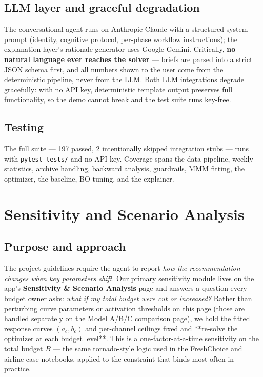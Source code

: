 \documentclass[11pt]{article}
\begin{document}
\subsection{LLM layer and graceful degradation}

The conversational agent runs on Anthropic Claude with a structured system prompt (identity, cognitive protocol, per-phase workflow instructions); the explanation layer's rationale generator uses Google Gemini. Critically, \textbf{no natural language ever reaches the solver} --- briefs are parsed into a strict JSON schema first, and all numbers shown to the user come from the deterministic pipeline, never from the LLM. Both LLM integrations degrade gracefully: with no API key, deterministic template output preserves full functionality, so the demo cannot break and the test suite runs key-free.

\subsection{Testing}

The full suite --- 197 passed, 2 intentionally skipped integration stubs --- runs with \texttt{pytest tests/} and no API key. Coverage spans the data pipeline, weekly statistics, archive handling, backward analysis, guardrails, MMM fitting, the optimizer, the baseline, BO tuning, and the explainer.

\section{Sensitivity and Scenario Analysis}

\subsection{Purpose and approach}

The project guidelines require the agent to report \emph{how the recommendation changes when key parameters shift}. Our primary sensitivity module lives on the app's \textbf{Sensitivity \& Scenario Analysis} page and answers a question every budget owner asks: \emph{what if my total budget were cut or increased?} Rather than perturbing curve parameters or activation thresholds on this page (those are handled separately on the Model A/B/C comparison page), we hold the fitted response curves $(a_c, b_c)$ and per-channel ceilings fixed and **re-solve the optimizer at each budget level**. This is a one-factor-at-a-time sensitivity on the total budget $B$ --- the same tornado-style logic used in the FreshChoice and airline case notebooks, applied to the constraint that binds most often in practice.
\end{document}
